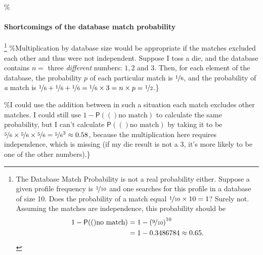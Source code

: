 \documentclass[10pt,dvipsnames,enabledeprecatedfontcommands]{scrartcl}
\let\oldparagraph\paragraph
\renewcommand{\paragraph}[1]{\oldparagraph{#1}\mbox{}}
\newcommand{\pr}[1]{\mathsf{P}(#1)}
\begin{document}
\%\paragraph{Shortcomings of the database match probability}

\footnote{The Database Match Probability is not a real probability either. Suppose a given profile frequency is $
\nicefrac{1}{10}$ and one searches for this profile in a database of size 10. Does the  probability of a match  equal $\nicefrac{1}{10}\times 10=1$? Surely not. Assuming the matches are independence, %
this probability should be
\begin{align*}
1-\pr(\textrm{no match}) & = 1- \left(\nicefrac{9}{10}\right)^{10}\\
& = 1- 0.3486784 \approx 0.65.
\end{align*}} \%Multiplication by database size would be appropriate if
the matches excluded each other and thus were not independent. Suppose I
toss a die, and the database contains \(n=\) three \emph{different}
numbers: \(1, 2\) and \(3\). Then, for each element of the database, the
probability \(p\) of each particular match is \(\nicefrac{1}{6}\), and
the probability of \emph{a} match is
\(\nicefrac{1}{6}+\nicefrac{1}{6}+\nicefrac{1}{6}=\nicefrac{1}{6}\times 3 = n\times p =\nicefrac{1}{2}\).\}

\%I could use the addition between in such a situation each match
excludes other matches. I could still use \(1-\pr(\textrm{no match})\)
to calculate the same probability, but I can't calculate
\(\pr(\textrm{no match})\) by taking it to be
\(\nicefrac{5}{6}\times \nicefrac{5}{6}\times \nicefrac{5}{6} = \nicefrac{5}{6}^3 \approx 0.58\),
because the multiplication here requires independence, which is missing
(if my die result is not a 3, it's more likely to be one of the other
numbers).\}
\end{document}
